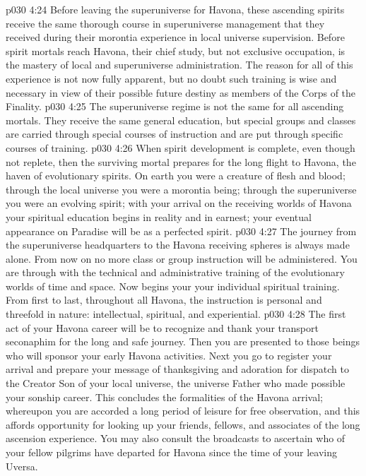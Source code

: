 \vs p030 4:24 Before leaving the superuniverse for Havona, these ascending spirits receive the same thorough course in superuniverse management that they received during their morontia experience in local universe supervision. Before spirit mortals reach Havona, their chief study, but not exclusive occupation, is the mastery of local and superuniverse administration. The reason for all of this experience is not now fully apparent, but no doubt such training is wise and necessary in view of their possible future destiny as members of the Corps of the Finality.
\vs p030 4:25 The superuniverse regime is not the same for all ascending mortals. They receive the same general education, but special groups and classes are carried through special courses of instruction and are put through specific courses of training.
\pc \vs p030 4:26 \bibnobreakspace {} When spirit development is complete, even though not replete, then the surviving mortal prepares for the long flight to Havona, the haven of evolutionary spirits. On earth you were a creature of flesh and blood; through the local universe you were a morontia being; through the superuniverse you were an evolving spirit; with your arrival on the receiving worlds of Havona your spiritual education begins in reality and in earnest; your eventual appearance on Paradise will be as a perfected spirit.\plusone
\vs p030 4:27 The journey from the superuniverse headquarters to the Havona receiving spheres is always made alone. From now on no more class or group instruction will be administered. You are through with the technical and administrative training of the evolutionary worlds of time and space. Now begins your  your individual spiritual training. From first to last, throughout all Havona, the instruction is personal and threefold in nature: intellectual, spiritual, and experiential.
\vs p030 4:28 The first act of your Havona career will be to recognize and thank your transport seconaphim for the long and safe journey. Then you are presented to those beings who will sponsor your early Havona activities. Next you go to register your arrival and prepare your message of thanksgiving and adoration for dispatch to the Creator Son of your local universe, the universe Father who made possible your sonship career. This concludes the formalities of the Havona arrival; whereupon you are accorded a long period of leisure for free observation, and this affords opportunity for looking up your friends, fellows, and associates of the long ascension experience. You may also consult the broadcasts to ascertain who of your fellow pilgrims have departed for Havona since the time of your leaving Uversa.\plusone
